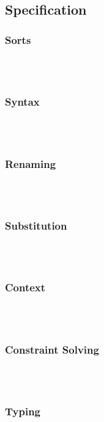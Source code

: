 \subsection{Specification}
\subsubsection{Sorts}\hfill\\\\

\subsubsection{Syntax}\hfill\\\\

\subsubsection{Renaming}\hfill\\\\

\subsubsection{Substitution}\hfill\\\\

\subsubsection{Context}\hfill\\\\

\subsubsection{Constraint Solving}\hfill\\\\

\subsubsection{Typing}\hfill\\\\

